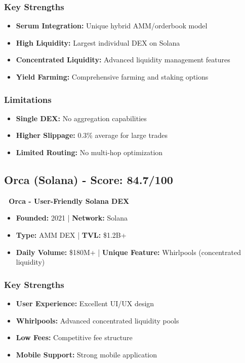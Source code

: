 \documentclass[11pt,a4paper]{article}
\begin{document}
\subsubsection{Key Strengths}
\begin{itemize}
    \item \textbf{Serum Integration:} Unique hybrid AMM/orderbook model
    \item \textbf{High Liquidity:} Largest individual DEX on Solana
    \item \textbf{Concentrated Liquidity:} Advanced liquidity management features
    \item \textbf{Yield Farming:} Comprehensive farming and staking options
\end{itemize}

\subsubsection{Limitations}
\begin{itemize}
    \item \textbf{Single DEX:} No aggregation capabilities
    \item \textbf{Higher Slippage:} 0.3\% average for large trades
    \item \textbf{Limited Routing:} No multi-hop optimization
\end{itemize}

\subsection{Orca (Solana) - Score: 84.7/100}

\begin{tcolorbox}[colback=deauraPurple!10,colframe=deauraPurple]
\textbf{🐋 Orca - User-Friendly Solana DEX}
\begin{itemize}
    \item \textbf{Founded:} 2021 | \textbf{Network:} Solana
    \item \textbf{Type:} AMM DEX | \textbf{TVL:} \$1.2B+
    \item \textbf{Daily Volume:} \$180M+ | \textbf{Unique Feature:} Whirlpools (concentrated liquidity)
\end{itemize}
\end{tcolorbox}

\subsubsection{Key Strengths}
\begin{itemize}
    \item \textbf{User Experience:} Excellent UI/UX design
    \item \textbf{Whirlpools:} Advanced concentrated liquidity pools
    \item \textbf{Low Fees:} Competitive fee structure
    \item \textbf{Mobile Support:} Strong mobile application
\end{itemize}
\end{document}
